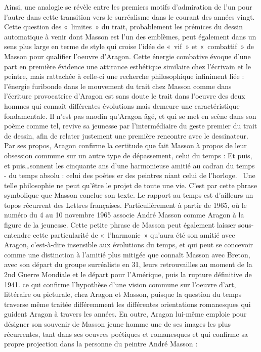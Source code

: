 	Ainsi, une analogie se révèle entre les premiers motifs d’admiration de l’un pour l’autre dans cette transition vers le surréalisme dans le courant des années vingt. Cette question des « limites » du trait, probablement les prémices du dessin automatique à venir dont Masson est l’un des emblèmes, peut également dans un sens plus large en terme de style qui croise l’idée de « vif » et « combattif » de Masson pour qualifier l’oeuvre d’Aragon. Cette énergie combative évoque d’une part en première évidence une attirance esthétique similaire chez l’écrivain et le peintre, mais rattachée à celle-ci une recherche philosophique infiniment liée : l’énergie furibonde dans le mouvement du trait chez Masson comme dans l’écriture provocatrice d’Aragon est sans doute le trait dans l’oeuvre des deux hommes qui connaît différentes évolutions mais demeure une caractéristique fondamentale. Il n’est pas anodin qu’Aragon âgé, et qui se met en scène dans son poème comme tel, revive sa jeunesse par l’intermédiaire du geste premier du trait de dessin, afin de relater justement une première rencontre avec le dessinateur. Par ses propos, Aragon confirme la certitude que fait Masson à propos de leur obsession commune sur un autre type de dépassement, celui du temps : 
Et puis, et puis…sonnent les cinquante ans d’une harmonieuse amitié au cadran du temps - du temps absolu : celui des poètes er des peintres niant celui de l’horloge. 
	Une telle philosophie ne peut qu’être le projet de toute une vie. C’est par cette phrase symbolique que Masson conclue son texte. Le rapport au temps est d’ailleurs un topos récurrent des Lettres françaises. Particulièrement à partir de 1965, où le numéro du 4 au 10 novembre 1965 associe André Masson comme Aragon à la figure de la jeunesse. Cette petite phrase de Masson peut également laisser sous-entendre cette particularité de « l’harmonie » qu’aura été son amitié avec Aragon, c’est-à-dire insensible aux  évolutions du temps, et qui peut se concevoir comme une distinction à l’amitié plus mitigée que connaît Masson avec Breton, avec son départ du groupe surréaliste en 31, leurs retrouvailles au moment de la 2nd Guerre Mondiale et le départ pour l’Amérique, puis la rupture définitive de 1941. ce qui confirme l’hypothèse d’une vision commune sur l’oeuvre d’art, littéraire ou picturale, chez Aragon et Masson, puisque la question du temps traverse même traitée différemment les différentes orientations romanesques qui guident Aragon à travers les années. 
	En outre, Aragon lui-même emploie pour désigner son souvenir de Masson jeune homme une de ses images les plus récurrentes, tant dans ses oeuvres poétiques et romanesques et qui confirme sa propre projection dans la personne du peintre André Masson : 
